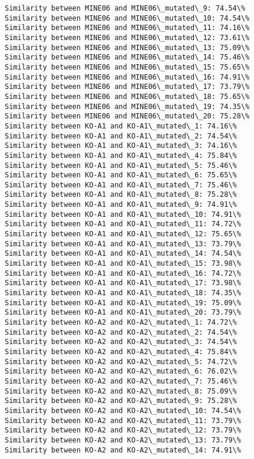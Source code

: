 \documentclass[11pt]{article}
\begin{document}
\begin{Verbatim}[commandchars=\\\{\}]
Similarity between MINE06 and MINE06\_mutated\_9: 74.54\%
Similarity between MINE06 and MINE06\_mutated\_10: 74.54\%
Similarity between MINE06 and MINE06\_mutated\_11: 74.16\%
Similarity between MINE06 and MINE06\_mutated\_12: 73.61\%
Similarity between MINE06 and MINE06\_mutated\_13: 75.09\%
Similarity between MINE06 and MINE06\_mutated\_14: 75.46\%
Similarity between MINE06 and MINE06\_mutated\_15: 75.65\%
Similarity between MINE06 and MINE06\_mutated\_16: 74.91\%
Similarity between MINE06 and MINE06\_mutated\_17: 73.79\%
Similarity between MINE06 and MINE06\_mutated\_18: 75.65\%
Similarity between MINE06 and MINE06\_mutated\_19: 74.35\%
Similarity between MINE06 and MINE06\_mutated\_20: 75.28\%
Similarity between KO-A1 and KO-A1\_mutated\_1: 74.16\%
Similarity between KO-A1 and KO-A1\_mutated\_2: 74.54\%
Similarity between KO-A1 and KO-A1\_mutated\_3: 74.16\%
Similarity between KO-A1 and KO-A1\_mutated\_4: 75.84\%
Similarity between KO-A1 and KO-A1\_mutated\_5: 75.46\%
Similarity between KO-A1 and KO-A1\_mutated\_6: 75.65\%
Similarity between KO-A1 and KO-A1\_mutated\_7: 75.46\%
Similarity between KO-A1 and KO-A1\_mutated\_8: 75.28\%
Similarity between KO-A1 and KO-A1\_mutated\_9: 74.91\%
Similarity between KO-A1 and KO-A1\_mutated\_10: 74.91\%
Similarity between KO-A1 and KO-A1\_mutated\_11: 74.72\%
Similarity between KO-A1 and KO-A1\_mutated\_12: 75.65\%
Similarity between KO-A1 and KO-A1\_mutated\_13: 73.79\%
Similarity between KO-A1 and KO-A1\_mutated\_14: 74.54\%
Similarity between KO-A1 and KO-A1\_mutated\_15: 73.98\%
Similarity between KO-A1 and KO-A1\_mutated\_16: 74.72\%
Similarity between KO-A1 and KO-A1\_mutated\_17: 73.98\%
Similarity between KO-A1 and KO-A1\_mutated\_18: 74.35\%
Similarity between KO-A1 and KO-A1\_mutated\_19: 75.09\%
Similarity between KO-A1 and KO-A1\_mutated\_20: 73.79\%
Similarity between KO-A2 and KO-A2\_mutated\_1: 74.72\%
Similarity between KO-A2 and KO-A2\_mutated\_2: 74.54\%
Similarity between KO-A2 and KO-A2\_mutated\_3: 74.54\%
Similarity between KO-A2 and KO-A2\_mutated\_4: 75.84\%
Similarity between KO-A2 and KO-A2\_mutated\_5: 74.72\%
Similarity between KO-A2 and KO-A2\_mutated\_6: 76.02\%
Similarity between KO-A2 and KO-A2\_mutated\_7: 75.46\%
Similarity between KO-A2 and KO-A2\_mutated\_8: 75.09\%
Similarity between KO-A2 and KO-A2\_mutated\_9: 75.28\%
Similarity between KO-A2 and KO-A2\_mutated\_10: 74.54\%
Similarity between KO-A2 and KO-A2\_mutated\_11: 73.79\%
Similarity between KO-A2 and KO-A2\_mutated\_12: 73.79\%
Similarity between KO-A2 and KO-A2\_mutated\_13: 73.79\%
Similarity between KO-A2 and KO-A2\_mutated\_14: 74.91\%

\end{Verbatim}
\end{document}
